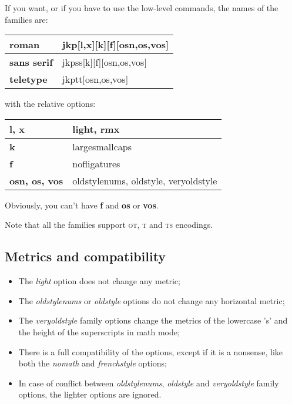 \documentclass[a4paper,11pt]{christophe}
\begin{document}
If you want, or if you have to use the low-level commands, the names of the families are:

\begin{center}\begin{tabular}{|l|l|}\hline
\textbf{roman}& jkp[l,x][k][f][osn,os,vos]\\\hline
\textbf{sans serif}& jkpss[k][f][osn,os,vos]\\\hline
\textbf{teletype}& jkptt[osn,os,vos]\\\hline
\end{tabular}\end{center}

with the relative options:

\begin{center}\begin{tabular}{|l|l|}\hline
\textbf{l, x}& light, rmx\\\hline
\textbf{k}& largesmallcaps\\\hline
\textbf{f}&nofligatures\\\hline
\textbf{osn, os, vos}& oldstylenums, oldstyle, veryoldstyle\\\hline
\end{tabular}\end{center}

Obviously, you can't have \textbf{f} and \textbf{os} or \textbf{vos}.

Note that all the families support \textsc{ot}, \textsc{t} and \textsc{ts} encodings.


\subsection{Metrics and compatibility}

\begin{itemize}
	\item The \textit{light} option does not change any metric;
	\item The \textit{oldstylenums} or \textit{oldstyle} options do not change any horizontal metric;
	\item The \textit{veryoldstyle} family options change the metrics of the lowercase 's'
				and the height of the superscripts in math mode;
	\item There is a full compatibility of the options, except if it is a nonsense,
				like both the \textit{nomath} and \textit{frenchstyle} options;
	\item In case of conflict between \textit{oldstylenums}, \textit{oldstyle} and \textit{veryoldstyle} family options,
				the lighter options are ignored.
\end{itemize}
\end{document}
